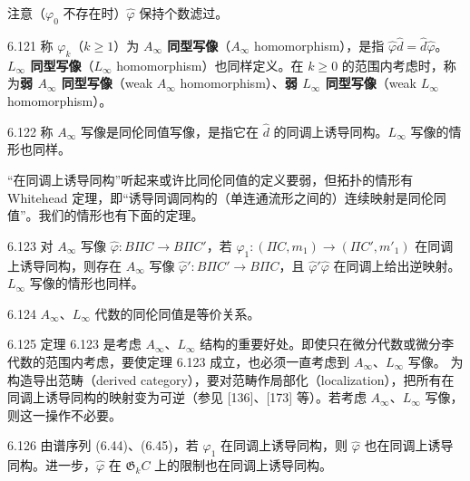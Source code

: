 注意（$\varphi_0$ 不存在时）$\hat\varphi$ 保持个数滤过。

\begin{definition}{6.121}
  称 $\varphi_k$（$k\ge1$）为 \textbf{$A_{\infty}$ 同型写像}（$A_{\infty}$ homomorphism），是指 $\hat\varphi\hat d=\hat d\hat\varphi$。\textbf{$L_{\infty}$ 同型写像}（$L_{\infty}$ homomorphism）也同样定义。在 $k\ge0$ 的范围内考虑时，称为\textbf{弱 $A_{\infty}$ 同型写像}（weak $A_{\infty}$ homomorphism）、\textbf{弱 $L_{\infty}$ 同型写像}（weak $L_{\infty}$ homomorphism）。
\end{definition}

\begin{definition}{6.122}
  称 $A_{\infty}$ 写像是同伦同值写像，是指它在 $\hat d$ 的同调上诱导同构。$L_{\infty}$ 写像的情形也同样。
\end{definition}

“在同调上诱导同构”听起来或许比同伦同值的定义要弱，但拓扑的情形有 Whitehead 定理，即“诱导同调同构的（单连通流形之间的）连续映射是同伦同值”。我们的情形也有下面的定理。

\begin{theorem}{6.123}
  对 $A_{\infty}$ 写像 $\hat\varphi\colon B\Pi C\to B\Pi C'$，若 $\varphi_1\colon(\Pi C,m_1)\to(\Pi C',m'_1)$ 在同调上诱导同构，则存在 $A_{\infty}$ 写像 $\hat\varphi'\colon B\Pi C'\to B\Pi C$，且 $\hat\varphi'\hat\varphi$ 在同调上给出逆映射。$L_{\infty}$ 写像的情形也同样。
\end{theorem}

\begin{corollary}{6.124}
  $A_{\infty}$、$L_{\infty}$ 代数的同伦同值是等价关系。
\end{corollary}

\begin{remark}{6.125}
  定理 6.123 是考虑 $A_{\infty}$、$L_{\infty}$ 结构的重要好处。即使只在微分代数或微分李代数的范围内考虑，要使定理 6.123 成立，也必须一直考虑到 $A_{\infty}$、$L_{\infty}$ 写像。
  为构造导出范畴（derived category），要对范畴作局部化（localization），把所有在同调上诱导同构的映射变为可逆（参见 [136]、[173] 等）。若考虑 $A_{\infty}$、$L_{\infty}$ 写像，则这一操作不必要。
\end{remark}

\begin{remark}{6.126}
  由谱序列 (6.44)、(6.45)，若 $\varphi_1$ 在同调上诱导同构，则 $\hat\varphi$ 也在同调上诱导同构。进一步，$\hat\varphi$ 在 $\mathfrak{G}_kC$ 上的限制也在同调上诱导同构。
\end{remark}

